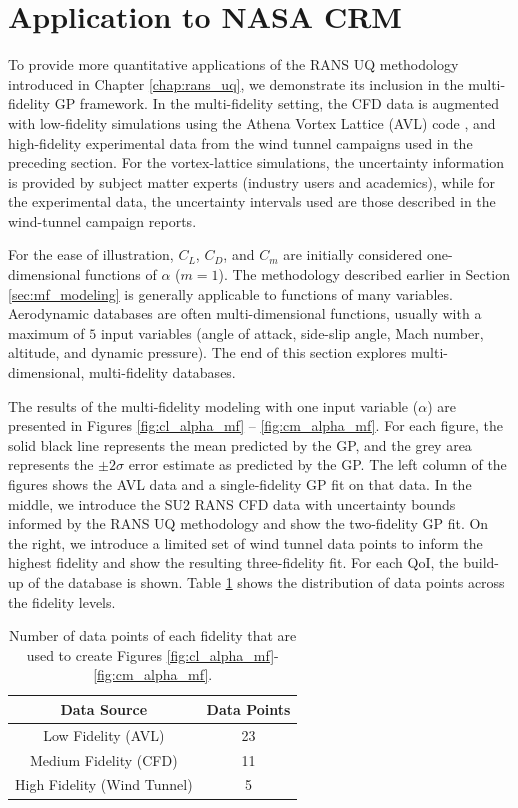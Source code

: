 \section{Application to NASA CRM} \label{sec:mf_gp_nasa_crm}

To provide more quantitative applications of the RANS UQ methodology introduced in Chapter \ref{chap:rans_uq}, we demonstrate its inclusion in the multi-fidelity GP framework.
In the multi-fidelity setting, the CFD data is augmented with low-fidelity simulations using the Athena Vortex Lattice (AVL) code \cite{drela2008athena}, and high-fidelity experimental data from the wind tunnel campaigns \cite{rivers_further_2012,rivers_experimental_2010} used in the preceding section.
For the vortex-lattice simulations, the uncertainty information is provided by subject matter experts (industry users and academics), while for the experimental data, the uncertainty intervals used are those described in the wind-tunnel campaign reports. 

For the ease of illustration, $C_L$, $C_D$, and $C_m$ are initially considered one-dimensional functions of $\alpha$ ($m = 1$).
The methodology described earlier in Section \ref{sec:mf_modeling} is generally applicable to functions of many variables.
Aerodynamic databases are often multi-dimensional functions, usually with a maximum of $5$ input variables (angle of attack, side-slip angle, Mach number, altitude, and dynamic pressure).
The end of this section explores multi-dimensional, multi-fidelity databases. 

The results of the multi-fidelity modeling with one input variable ($\alpha$) are presented in Figures \ref{fig:cl_alpha_mf} -- \ref{fig:cm_alpha_mf}.
For each figure, the solid black line represents the mean predicted by the GP, and the grey area represents the $\pm 2\sigma$ error estimate as predicted by the GP.
The left column of the figures shows the AVL data and a single-fidelity GP fit on that data.
In the middle, we introduce the SU2 RANS CFD data with uncertainty bounds informed by the RANS UQ methodology and show the two-fidelity GP fit.
On the right, we introduce a limited set of wind tunnel data points to inform the highest fidelity and show the resulting three-fidelity fit.
For each QoI, the build-up of the database is shown.
Table \ref{table:data_points} shows the distribution of data points across the fidelity levels.

\begin{table}
\centering
    \renewcommand{\arraystretch}{1.2}
    \captionsetup{justification=centering}
    \caption{Number of data points of each fidelity that are used to create Figures \ref{fig:cl_alpha_mf}-\ref{fig:cm_alpha_mf}.} 
    \begin{tabular}{c|c}
        Data Source & Data Points \\ \hline
        Low Fidelity (AVL) & 23 \\ 
        Medium Fidelity (CFD) & 11 \\  
        High Fidelity (Wind Tunnel) & 5 \\  
    \end{tabular}
    \label{table:data_points}
\end{table}


